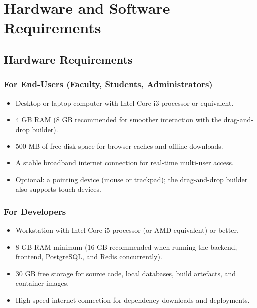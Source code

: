 \section{Hardware and Software Requirements}

\subsection{Hardware Requirements}

\subsubsection{For End-Users (Faculty, Students, Administrators)}
\begin{itemize}
    \item Desktop or laptop computer with Intel Core i3 processor or equivalent.
    \item 4 GB RAM (8 GB recommended for smoother interaction with the drag-and-drop builder).
    \item 500 MB of free disk space for browser caches and offline downloads.
    \item A stable broadband internet connection for real-time multi-user access.
    \item Optional: a pointing device (mouse or trackpad); the drag-and-drop builder also supports touch devices.
\end{itemize}

\subsubsection{For Developers}
\begin{itemize}
    \item Workstation with Intel Core i5 processor (or AMD equivalent) or better.
    \item 8 GB RAM minimum (16 GB recommended when running the backend, frontend, PostgreSQL, and Redis concurrently).
    \item 30 GB free storage for source code, local databases, build artefacts, and container images.
    \item High-speed internet connection for dependency downloads and deployments.
\end{itemize}

